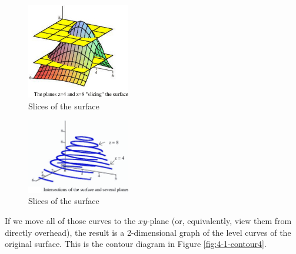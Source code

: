 \begin{figure}[!ht]
  \centering
    \includegraphics[width=0.4\textwidth]{img/chap4/image020.png}
    \caption{Slices of the surface}
    \label{fig:4-1-surfaceSlice}
  \end{figure}\begin{figure}[!ht]
    \centering
      \includegraphics[width=0.4\textwidth]{img/chap4/image021.png}
      \caption{Slices of the surface}
      \label{fig:4-1-surfaceSlice2}
    \end{figure}
If we move all of those curves to the $xy$-plane (or, equivalently, view them from directly overhead), the result is a 2-dimensional graph of the level curves of the original surface. This is the contour diagram in Figure \ref{fig:4-1-contour4}.

